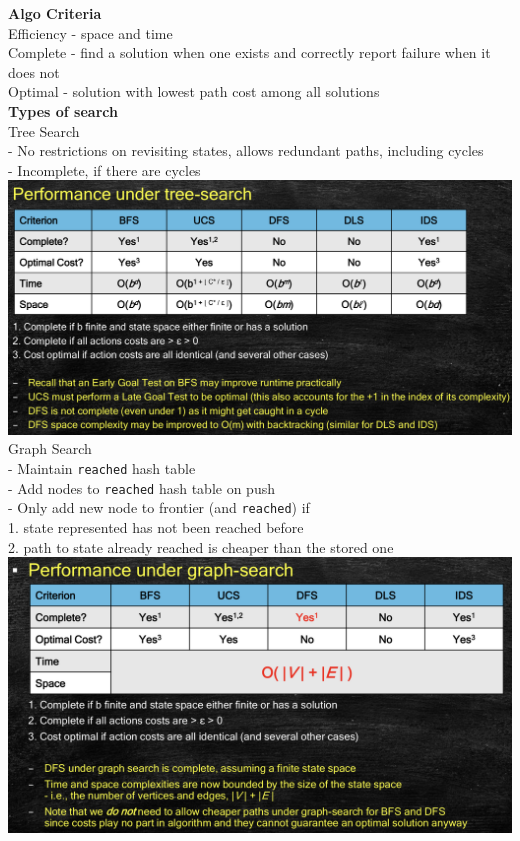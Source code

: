 \documentclass[10pt, a4paper]{article}
\newcommand{\blue}[1]{{\color{MidnightBlue}#1}}
\newcommand{\green}[1]{{\color{ForestGreen}#1}}
\newcommand{\tab}[0]{\hspace*{2mm}}
\begin{document}
\begin{multicols*}{3}
	  \textbf{Algo Criteria}\\
	  Efficiency - space and time\\
	  \green{Complete} - find a solution when one exists and correctly report failure when it does not\\
	  \green{Optimal} - solution with \blue{lowest} path cost among all solutions\\

	  \textbf{Types of search}\\
	  Tree Search\\
	  \tab - No restrictions on revisiting states, allows redundant paths, including cycles\\
	  \tab - Incomplete, if there are cycles\\
	  \includegraphics[scale=0.15]{./assets/treeSearch.png}\\
	  Graph Search\\
	  \tab - Maintain \texttt{reached} hash table \\
	  \tab - Add nodes to \texttt{reached} hash table on push\\
	  \tab - Only add new node to frontier (and \texttt{reached}) if\\
	  \tab \tab 1. state represented has not been reached before\\
	  \tab \tab 2. path to state already reached is cheaper than the stored one\\
	  \includegraphics[scale=.15]{./assets/graphSearch.png}\\

\end{multicols*}
\end{document}
